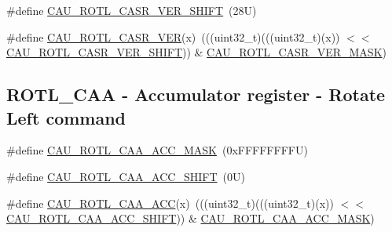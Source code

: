 \begin{DoxyCompactItemize}
\item 
\#define \mbox{\hyperlink{group___c_a_u___register___masks_gad4f7b9dfa3900a1a24b391b7c515d0e4}{C\+A\+U\+\_\+\+R\+O\+T\+L\+\_\+\+C\+A\+S\+R\+\_\+\+V\+E\+R\+\_\+\+S\+H\+I\+FT}}~(28\+U)
\item 
\#define \mbox{\hyperlink{group___c_a_u___register___masks_ga8dc294f60e158cddfefa8728889a8763}{C\+A\+U\+\_\+\+R\+O\+T\+L\+\_\+\+C\+A\+S\+R\+\_\+\+V\+ER}}(x)~(((uint32\+\_\+t)(((uint32\+\_\+t)(x)) $<$$<$ \mbox{\hyperlink{group___c_a_u___register___masks_gad4f7b9dfa3900a1a24b391b7c515d0e4}{C\+A\+U\+\_\+\+R\+O\+T\+L\+\_\+\+C\+A\+S\+R\+\_\+\+V\+E\+R\+\_\+\+S\+H\+I\+FT}})) \& \mbox{\hyperlink{group___c_a_u___register___masks_ga6d8f0ea43478a075cf2a0c9745bd211c}{C\+A\+U\+\_\+\+R\+O\+T\+L\+\_\+\+C\+A\+S\+R\+\_\+\+V\+E\+R\+\_\+\+M\+A\+SK}})
\end{DoxyCompactItemize}
\subsection*{R\+O\+T\+L\+\_\+\+C\+AA -\/ Accumulator register -\/ Rotate Left command}
\begin{DoxyCompactItemize}
\item 
\#define \mbox{\hyperlink{group___c_a_u___register___masks_ga0aa131c13271bf31c8f88c3c7dce8729}{C\+A\+U\+\_\+\+R\+O\+T\+L\+\_\+\+C\+A\+A\+\_\+\+A\+C\+C\+\_\+\+M\+A\+SK}}~(0x\+F\+F\+F\+F\+F\+F\+F\+F\+U)
\item 
\#define \mbox{\hyperlink{group___c_a_u___register___masks_gac36dbf4828c435c589cbcee42b1356d3}{C\+A\+U\+\_\+\+R\+O\+T\+L\+\_\+\+C\+A\+A\+\_\+\+A\+C\+C\+\_\+\+S\+H\+I\+FT}}~(0\+U)
\item 
\#define \mbox{\hyperlink{group___c_a_u___register___masks_ga1063642340f6774011d044d0abe0ee8d}{C\+A\+U\+\_\+\+R\+O\+T\+L\+\_\+\+C\+A\+A\+\_\+\+A\+CC}}(x)~(((uint32\+\_\+t)(((uint32\+\_\+t)(x)) $<$$<$ \mbox{\hyperlink{group___c_a_u___register___masks_gac36dbf4828c435c589cbcee42b1356d3}{C\+A\+U\+\_\+\+R\+O\+T\+L\+\_\+\+C\+A\+A\+\_\+\+A\+C\+C\+\_\+\+S\+H\+I\+FT}})) \& \mbox{\hyperlink{group___c_a_u___register___masks_ga0aa131c13271bf31c8f88c3c7dce8729}{C\+A\+U\+\_\+\+R\+O\+T\+L\+\_\+\+C\+A\+A\+\_\+\+A\+C\+C\+\_\+\+M\+A\+SK}})
\end{DoxyCompactItemize}
